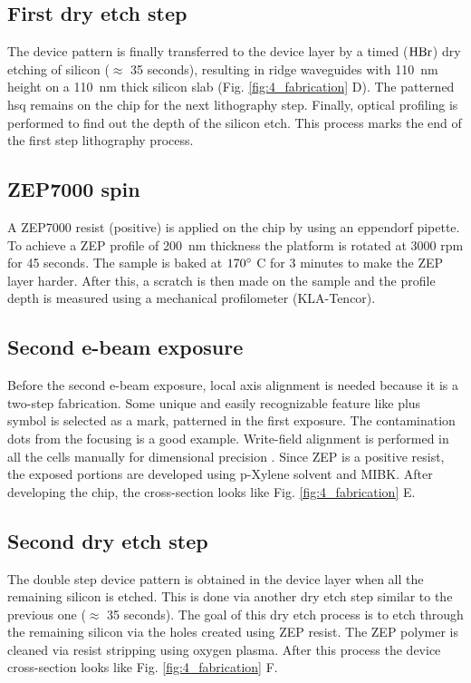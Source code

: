 \documentclass[../report.tex]{subfiles}
\begin{document}
\subsection{First dry etch step}
The device pattern is finally transferred to the device layer by a timed ($\mathrm{HBr}$) dry etching of silicon ($\approx$ 35 seconds), resulting in ridge waveguides with \SI{110}{\nano \meter} height on a \SI{110}{\nano \meter} thick silicon slab (Fig. \ref{fig:4_fabrication} D). The patterned \gls{hsq} remains on the chip for the next lithography step. Finally, optical profiling is performed to find out the depth of the silicon etch. This process marks the end of the first step lithography process.

\subsection{ZEP7000 spin}
A ZEP7000 resist (positive) is applied on the chip by using an eppendorf pipette. To achieve a ZEP profile of \SI{200}{\nano \meter} thickness the platform is rotated at 3000 rpm for 45 seconds. The sample is baked at $\mathrm{170^{\circ}}$ C for 3 minutes to make the ZEP layer harder. After this, a scratch is then made on the sample and the profile depth is measured using a mechanical profilometer (KLA-Tencor).

\subsection{Second e-beam exposure}
Before the second e-beam exposure, local axis alignment is needed because it is a two-step fabrication. Some unique and easily recognizable feature like plus symbol is selected as a mark, patterned in the first exposure. The contamination dots from the focusing is a good example. Write-field alignment is performed in all the cells manually for dimensional precision \cite{write_field}. Since ZEP is a positive resist, the exposed portions are developed using p-Xylene solvent and MIBK. After developing the chip, the cross-section looks like Fig. \ref{fig:4_fabrication} E.

\subsection{Second dry etch step}
The double step device pattern is obtained in the device layer when all the remaining silicon is etched. This is done via another dry etch step similar to the previous one ($\approx$ 35 seconds). The goal of this dry etch process is to etch through the remaining silicon via the holes created using ZEP resist. The ZEP polymer is cleaned via resist stripping using oxygen plasma. After this process the device cross-section looks like Fig. \ref{fig:4_fabrication} F. 
\end{document}

